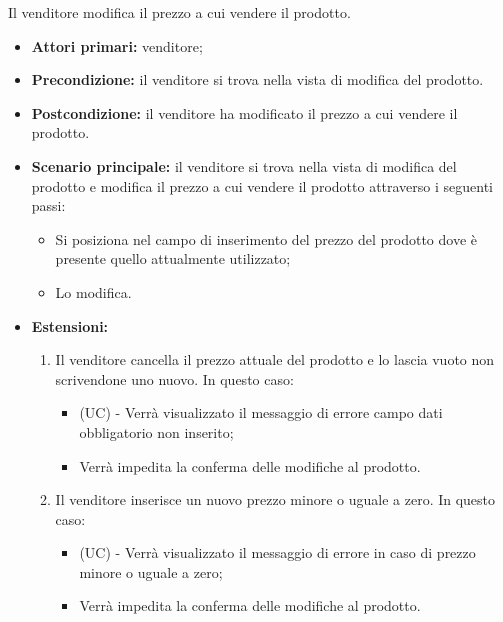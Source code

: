 Il venditore modifica il prezzo a cui vendere il prodotto.
\begin{itemize}
    \item \textbf{Attori primari:} venditore;
    \item \textbf{Precondizione:} il venditore si trova nella vista di modifica del prodotto.
    \item \textbf{Postcondizione:} il venditore ha modificato il prezzo a cui vendere il prodotto.
    \item \textbf{Scenario principale:} il venditore si trova nella vista di modifica del prodotto e modifica il prezzo a cui vendere il prodotto attraverso i seguenti passi:
    \begin{itemize} 
        \item Si posiziona nel campo di inserimento del prezzo del prodotto dove è presente quello attualmente utilizzato;
        \item Lo modifica.
    \end{itemize}
    \item \textbf{Estensioni:}
    \begin{enumerate}
    	\item Il venditore cancella il prezzo attuale del prodotto e lo lascia vuoto non scrivendone uno nuovo. In questo caso:
    	\begin{itemize}
    		\item (UC) - Verrà visualizzato il messaggio di errore campo dati obbligatorio non inserito;
    		\item Verrà impedita la conferma delle modifiche al prodotto.
    	\end{itemize}
    	\item Il venditore inserisce un nuovo prezzo minore o uguale a zero. In questo caso:
    	\begin{itemize}
    		\item (UC) - Verrà visualizzato il messaggio di errore in caso di prezzo minore o uguale a zero;
    		\item Verrà impedita la conferma delle modifiche al prodotto.
    	\end{itemize}
    \end{enumerate}
\end{itemize}


